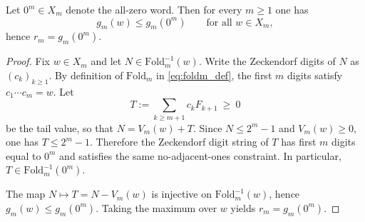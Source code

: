 \begin{lemma}\label{lem:rm_attained_at_zero_prefix}
\MathTag Let $0^m\in X_m$ denote the all-zero word.
Then for every $m\ge 1$ one has
\[
g_m(w)\le g_m(0^m)\qquad\text{for all }w\in X_m,
\]
hence $r_m=g_m(0^m)$.
\end{lemma}
\begin{proof}
Fix $w\in X_m$ and let $N\in\mathrm{Fold}_m^{-1}(w)$.
Write the Zeckendorf digits of $N$ as $(c_k)_{k\ge 1}$.
By definition of $\mathrm{Fold}_m$ in \eqref{eq:foldm_def}, the first $m$ digits satisfy $c_1\cdots c_m=w$.
Let
\[
T:=\sum_{k\ge m+1} c_k F_{k+1}\ \ge\ 0
\]
be the tail value, so that $N=V_m(w)+T$.
Since $N\le 2^m-1$ and $V_m(w)\ge 0$, one has $T\le 2^m-1$.
Therefore the Zeckendorf digit string of $T$ has first $m$ digits equal to $0^m$ and satisfies the same no-adjacent-ones constraint.
In particular, $T\in \mathrm{Fold}_m^{-1}(0^m)$.
\par
The map $N\mapsto T=N-V_m(w)$ is injective on $\mathrm{Fold}_m^{-1}(w)$, hence
$g_m(w)\le g_m(0^m)$.
Taking the maximum over $w$ yields $r_m=g_m(0^m)$.
\end{proof}

